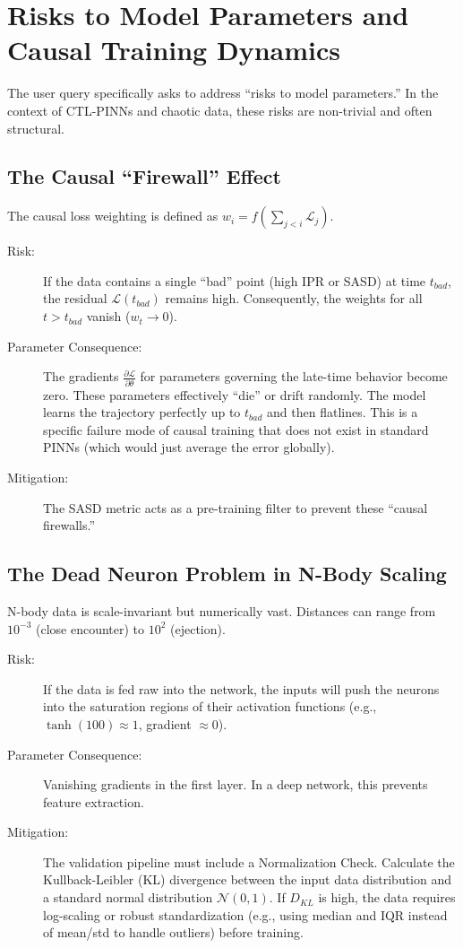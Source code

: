 \section{Risks to Model Parameters and Causal Training Dynamics}

The user query specifically asks to address ``risks to model parameters.'' In the context of CTL-PINNs and chaotic data, these risks are non-trivial and often structural.

\subsection{The Causal ``Firewall'' Effect}

The causal loss weighting is defined as $w_i = f(\sum_{j<i} \mathcal{L}_j)$.
\begin{description}
    \item[Risk:] If the data contains a single ``bad'' point (high IPR or SASD) at time $t_{bad}$, the residual $\mathcal{L}(t_{bad})$ remains high. Consequently, the weights for all $t > t_{bad}$ vanish ($w_t \to 0$).
    \item[Parameter Consequence:] The gradients $\frac{\partial \mathcal{L}}{\partial \theta}$ for parameters governing the late-time behavior become zero. These parameters effectively ``die'' or drift randomly. The model learns the trajectory perfectly up to $t_{bad}$ and then flatlines. This is a specific failure mode of causal training that does not exist in standard PINNs (which would just average the error globally).
    \item[Mitigation:] The SASD metric acts as a pre-training filter to prevent these ``causal firewalls.''
\end{description}

\subsection{The Dead Neuron Problem in N-Body Scaling}

N-body data is scale-invariant but numerically vast. Distances can range from $10^{-3}$ (close encounter) to $10^2$ (ejection).
\begin{description}
    \item[Risk:] If the data is fed raw into the network, the inputs will push the neurons into the saturation regions of their activation functions (e.g., $\tanh(100) \approx 1$, gradient $\approx 0$).
    \item[Parameter Consequence:] Vanishing gradients in the first layer. In a deep network, this prevents feature extraction.
    \item[Mitigation:] The validation pipeline must include a Normalization Check. Calculate the Kullback-Leibler (KL) divergence between the input data distribution and a standard normal distribution $\mathcal{N}(0, 1)$. If $D_{KL}$ is high, the data requires log-scaling or robust standardization (e.g., using median and IQR instead of mean/std to handle outliers) before training.
\end{description}


